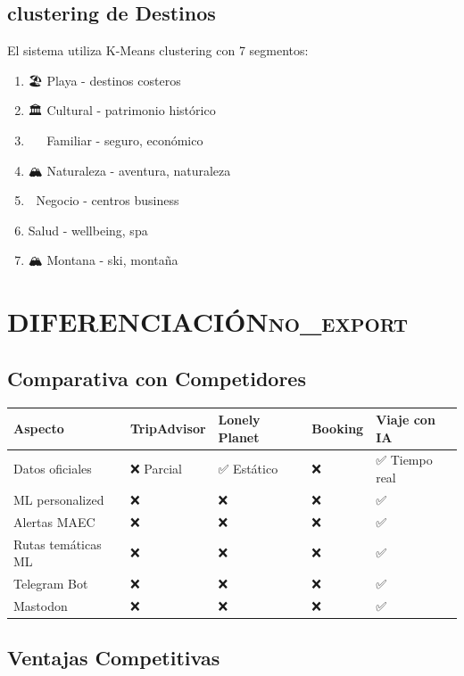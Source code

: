 \documentclass[11pt]{article}
\begin{document}
\subsection{clustering de Destinos}
\label{sec:orgb5e309e}

El sistema utiliza K-Means clustering con 7 segmentos:
\begin{enumerate}
\item 🏖️ Playa - destinos costeros
\item 🏛️ Cultural - patrimonio histórico
\item 👨‍👩‍👧‍👦 Familiar - seguro, económico
\item 🏔️ Naturaleza - aventura, naturaleza
\item 💼 Negocio - centros business
\item Salud - wellbeing, spa
\item 🏔️ Montana - ski, montaña
\end{enumerate}

\section{DIFERENCIACIÓN\hfill{}\textsc{no\_export}}
\label{sec:orgb572a20}
\subsection{Comparativa con Competidores}
\label{sec:orgceb8615}

\begin{center}
\begin{tabular}{lllll}
Aspecto & TripAdvisor & Lonely Planet & Booking & Viaje con IA\\
\hline
Datos oficiales & ❌ Parcial & ✅ Estático & ❌ & ✅ Tiempo real\\
ML personalized & ❌ & ❌ & ❌ & ✅\\
Alertas MAEC & ❌ & ❌ & ❌ & ✅\\
Rutas temáticas ML & ❌ & ❌ & ❌ & ✅\\
Telegram Bot & ❌ & ❌ & ❌ & ✅\\
Mastodon & ❌ & ❌ & ❌ & ✅\\
\end{tabular}
\end{center}

\subsection{Ventajas Competitivas}
\label{sec:orgd0e07fa}
\end{document}
